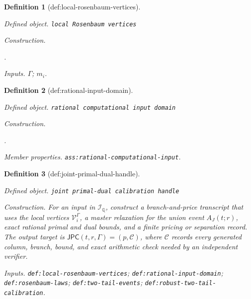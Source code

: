 \documentclass{article}
\newtheorem{definition}{Definition}
\begin{document}
\begin{definition}[def:local-rosenbaum-vertices]\label{def:local-rosenbaum-vertices}
\par\smallskip\noindent\emph{Defined object.} \texttt{local Rosenbaum vertices}
\par\smallskip\noindent\emph{Construction.} \par\noindent {}\par\noindent.
\par\smallskip\noindent\emph{Inputs.} \(\Gamma\); \(m_i\).
\end{definition}

\begin{definition}[def:rational-input-domain]\label{def:rational-input-domain}
\par\smallskip\noindent\emph{Defined object.} \texttt{rational computational input domain}
\par\smallskip\noindent\emph{Construction.} \par\noindent {}\par\noindent.
\par\smallskip\noindent\emph{Member properties.} \texttt{ass:\allowbreak{}rational-\allowbreak{}computational-\allowbreak{}input}.
\end{definition}

\begin{definition}[def:joint-primal-dual-handle]\label{def:joint-primal-dual-handle}
\par\smallskip\noindent\emph{Defined object.} \texttt{joint primal-\allowbreak{}dual calibration handle}
\par\smallskip\noindent\emph{Construction.} For an input in \(\mathcal I_{\mathbb Q}\), construct a branch-and-price transcript that uses the local vertices \(\mathcal V_i^\Gamma\), a master relaxation for the union event \(A_J(t;r)\), exact rational primal and dual bounds, and a finite pricing or separation record. The output target is \(\mathsf{JPC}(t,r,\Gamma)=(p,\mathcal C)\), where \(\mathcal C\) records every generated column, branch, bound, and exact arithmetic check needed by an independent verifier.
\par\smallskip\noindent\emph{Inputs.} \texttt{def:\allowbreak{}local-\allowbreak{}rosenbaum-\allowbreak{}vertices}; \texttt{def:\allowbreak{}rational-\allowbreak{}input-\allowbreak{}domain}; \texttt{def:\allowbreak{}rosenbaum-\allowbreak{}laws}; \texttt{def:\allowbreak{}two-\allowbreak{}tail-\allowbreak{}events}; \texttt{def:\allowbreak{}robust-\allowbreak{}two-\allowbreak{}tail-\allowbreak{}calibration}.
\end{definition}
\end{document}

